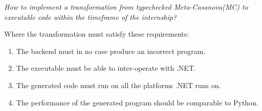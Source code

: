 \textit{How to implement a transformation from typechecked Meta-Casanova(MC) to executable code within the timeframe of the internship?}

Where the transformation must satisfy these requirements:
\begin{enumerate}
    \item The backend must in no case produce an incorrect program.
    \item The executable must be able to inter-operate with .NET.
    \item The generated code must run on all the platforms .NET runs on.
    \item The performance of the generated program should be comparable to Python.
\end{enumerate}

